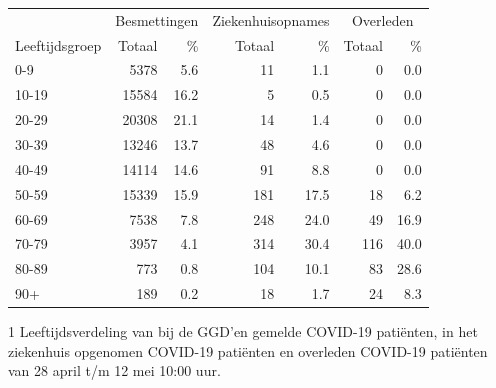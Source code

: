 \documentclass[
  english,
  man,floatsintext]{apa6}
\begin{document}
\begin{table}
\centering\begingroup\fontsize{11}{13}\selectfont

\begin{threeparttable}
\begin{tabular}{lrrrrrr}
\toprule
\multicolumn{1}{c}{ } & \multicolumn{2}{c}{Besmettingen} & \multicolumn{2}{c}{Ziekenhuisopnames} & \multicolumn{2}{c}{Overleden} \\
\cmidrule(l{3pt}r{3pt}){2-3} \cmidrule(l{3pt}r{3pt}){4-5} \cmidrule(l{3pt}r{3pt}){6-7}
Leeftijdsgroep & Totaal & \% & Totaal & \% & Totaal & \%\\
\midrule
0-9 & 5378 & 5.6 & 11 & 1.1 & 0 & 0.0\\
10-19 & 15584 & 16.2 & 5 & 0.5 & 0 & 0.0\\
20-29 & 20308 & 21.1 & 14 & 1.4 & 0 & 0.0\\
30-39 & 13246 & 13.7 & 48 & 4.6 & 0 & 0.0\\
40-49 & 14114 & 14.6 & 91 & 8.8 & 0 & 0.0\\
50-59 & 15339 & 15.9 & 181 & 17.5 & 18 & 6.2\\
60-69 & 7538 & 7.8 & 248 & 24.0 & 49 & 16.9\\
70-79 & 3957 & 4.1 & 314 & 30.4 & 116 & 40.0\\
80-89 & 773 & 0.8 & 104 & 10.1 & 83 & 28.6\\
90+ & 189 & 0.2 & 18 & 1.7 & 24 & 8.3\\
\bottomrule
\end{tabular}
\begin{tablenotes}
\item[1] Leeftijdsverdeling van bij de GGD’en gemelde COVID-19 patiënten, in het ziekenhuis opgenomen COVID-19 patiënten en overleden COVID-19 patiënten van 28 april t/m 12 mei 10:00 uur.
\end{tablenotes}
\end{threeparttable}
\endgroup{}
\end{table}

\newpage
\end{document}
